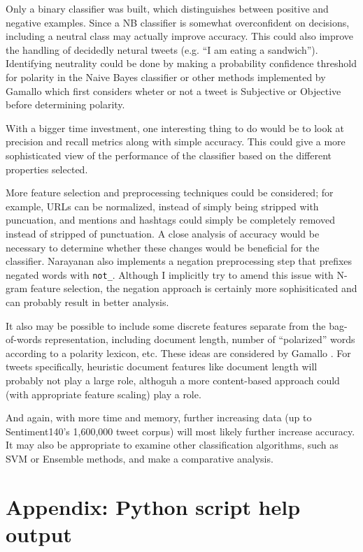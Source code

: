 \documentclass[letter,12pt]{article}
\begin{document}
Only a binary classifier was built, which distinguishes between positive and
negative examples. Since a NB classifier is somewhat overconfident on
decisions, including a neutral class may actually improve accuracy. This could
also improve the handling of decidedly netural tweets (e.g. ``I am eating a
sandwich''). Identifying neutrality could be done by making a probability
confidence threshold for polarity in the Naive Bayes classifier or other
methods implemented by Gamallo \cite{gamallo14} which first considers wheter or
not a tweet is Subjective or Objective before determining polarity.

With a bigger time investment, one interesting thing to do would be to look at
precision and recall metrics along with simple accuracy. This could give a more
sophisticated view of the performance of the classifier based on the different
properties selected.

More feature selection and preprocessing techniques could be considered; for
example, URLs can be normalized, instead of simply being stripped with
puncuation, and mentions and hashtags could simply be completely removed
instead of stripped of punctuation. A close analysis of accuracy would be
necessary to determine whether these changes would be beneficial for the
classifier. Narayanan \cite{narayanan13} also implements a negation
preprocessing step that prefixes negated words with \texttt{not\_}. Although I
implicitly try to amend this issue with N-gram feature selection, the negation
approach is certainly more sophisiticated and can probably result in better
analysis.

It also may be possible to include some discrete features separate from the
bag-of-words representation, including document length, number of ``polarized''
words according to a polarity lexicon, etc. These ideas are considered by
Gamallo \cite{gamallo14}. For tweets specifically, heuristic document features
like document length will probably not play a large role, althoguh a more
content-based approach could (with appropriate feature scaling) play a role.

And again, with more time and memory, further increasing data (up to
Sentiment140's 1,600,000 tweet corpus) will most likely further increase
accuracy. It may also be appropriate to examine other classification
algorithms, such as SVM or Ensemble methods, and make a comparative analysis.

\appendix
\section{Appendix: Python script help output}
\end{document}
